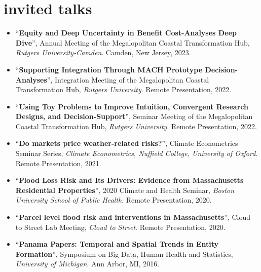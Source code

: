 \documentclass[10pt,oneside]{article}
\begin{document}
\mbox{}\vspace{-\dimexpr\baselineskip\relax}
\vspace*{-1em}
\printbibliography[type=report, heading=none]


\section{invited talks}

\mbox{}\vspace{-\dimexpr\baselineskip\relax}

\begin{itemize}[label={}]

  \item \enquote{\textbf{Equity and Deep Uncertainty in Benefit Cost-Analyses Deep Dive}}, Annual Meeting of the Megalopolitan Coastal Transformation Hub,  \textit{Rutgers University-Camden}. Camden, New Jersey, 2023.

  \item \enquote{\textbf{Supporting Integration Through MACH Prototype Decision-Analyses}}, Integration Meeting of the Megalopolitan Coastal Transformation Hub,  \textit{Rutgers University}. Remote Presentation, 2022.

  \item \enquote{\textbf{Using Toy Problems to Improve Intuition, Convergent Research Designs, and Decision-Support}}, Seminar Meeting of the Megalopolitan Coastal Transformation Hub,  \textit{Rutgers University}. Remote Presentation, 2022.

  \item \enquote{\textbf{Do markets price weather-related risks?}}, Climate Econometrics Seminar Series,  \textit{Climate Econometrics, Nuffield College, University of Oxford}. Remote Presentation, 2021.

  \item \enquote{\textbf{Flood Loss Risk and Its Drivers: Evidence from Massachusetts Residential Properties}}, 2020 Climate and Health Seminar,  \textit{Boston University School of Public Health}. Remote Presentation, 2020.

  \item \enquote{\textbf{Parcel level flood risk and interventions in Massachusetts}}, Cloud to Street Lab Meeting,  \textit{Cloud to Street}. Remote Presentation, 2020.

  \item \enquote{\textbf{Panama Papers: Temporal and Spatial Trends in Entity Formation}}, Symposium on Big Data, Human Health and Statistics,  \textit{University of Michigan}. Ann Arbor, MI, 2016.

\end{itemize}
\end{document}
